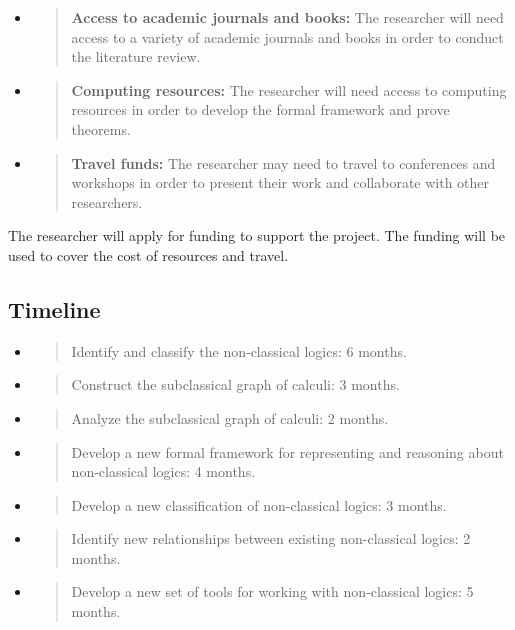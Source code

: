 \begin{itemize}
\item
  \begin{quote}
  \textbf{Access to academic journals and books:} The researcher will
  need access to a variety of academic journals and books in order to
  conduct the literature review.
  \end{quote}
\item
  \begin{quote}
  \textbf{Computing resources:} The researcher will need access to
  computing resources in order to develop the formal framework and prove
  theorems.
  \end{quote}
\item
  \begin{quote}
  \textbf{Travel funds:} The researcher may need to travel to
  conferences and workshops in order to present their work and
  collaborate with other researchers.
  \end{quote}
\end{itemize}

The researcher will apply for funding to support the project. The
funding will be used to cover the cost of resources and travel.

\hypertarget{timeline}{%
\subsection{Timeline}\label{timeline}}

\begin{itemize}
\item
  \begin{quote}
  Identify and classify the non-classical logics: 6 months.
  \end{quote}
\item
  \begin{quote}
  Construct the subclassical graph of calculi: 3 months.
  \end{quote}
\item
  \begin{quote}
  Analyze the subclassical graph of calculi: 2 months.
  \end{quote}
\item
  \begin{quote}
  Develop a new formal framework for representing and reasoning about
  non-classical logics: 4 months.
  \end{quote}
\item
  \begin{quote}
  Develop a new classification of non-classical logics: 3 months.
  \end{quote}
\item
  \begin{quote}
  Identify new relationships between existing non-classical logics: 2
  months.
  \end{quote}
\item
  \begin{quote}
  Develop a new set of tools for working with non-classical logics: 5
  months.
  \end{quote}
\end{itemize}

